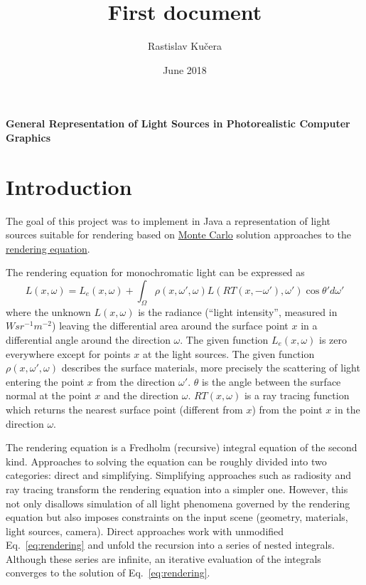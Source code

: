 \documentclass[12pt, letterpaper]{article}
\title{First document}
\author{Rastislav Kučera}
\date{June 2018}
\begin{document}
\begin{titlepage}\centering
\thispagestyle{MyFirstPage}
\vspace*{\fill}
\LARGE \textbf{General Representation of Light Sources in Photorealistic Computer Graphics} 
\vspace*{\fill}
\end{titlepage}

\section{Introduction}

The goal of this project was to implement in Java a representation of light sources suitable for 
rendering based on \href{https://en.wikipedia.org/wiki/Monte_Carlo_method}{Monte Carlo} solution approaches to the \href{http://www.cse.chalmers.se/edu/year/2011/course/TDA361/2007/rend_eq.pdf}{rendering equation}.

The rendering equation for monochromatic light can be expressed as
\begin{equation}
L(x, \omega)=L_e(x, \omega)+\int_\Omega{\rho(x, \omega', \omega) L(RT(x, -\omega'), \omega') \cos{\theta'} d\omega'}
\label{eq:rendering}
\end{equation}
where the unknown $L(x, \omega)$ is the radiance (``light intensity'', measured in $W sr^{-1}m^{-2}$) leaving the differential area around the surface point $x$ in a differential angle around the direction $\omega$. The given function $L_e(x, \omega)$ is zero everywhere except for points $x$ at the light sources. The given function $\rho(x, \omega', \omega)$ describes the surface materials, more precisely the scattering of light entering the point $x$ from the direction $\omega'$. $\theta$ is the angle between the surface normal at the point $x$ and the direction $\omega$. $RT(x, \omega)$ is a ray tracing function which returns the nearest surface point (different from $x$) from the point $x$ in the direction $\omega$.

The rendering equation is a Fredholm (recursive) integral equation of the second kind. Approaches to solving the equation can be roughly divided into two categories: direct and simplifying. Simplifying approaches such as radiosity and ray tracing transform the rendering equation into a simpler one. However, this not only disallows simulation of all light phenomena governed by the rendering equation but also imposes constraints on the input scene (geometry, materials, light sources, camera). Direct approaches work with unmodified Eq.~\ref{eq:rendering} and unfold the recursion into a series of nested integrals. Although these series are infinite, an iterative evaluation of the integrals converges to the solution of Eq.~\ref{eq:rendering}.
\end{document}
